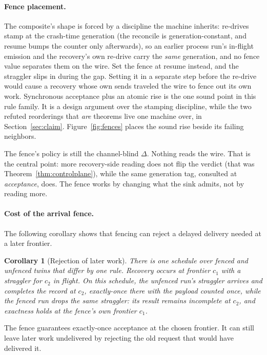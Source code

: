 \documentclass[sigplan,10pt]{acmart}
\theoremstyle{plain}
\newtheorem{corollary}{Corollary}[section]
\theoremstyle{definition}
\newcommand{\sdelta}{\Delta}               %
\begin{document}
\paragraph{Fence placement.}
The composite's shape is forced by a discipline the machine inherits:
re-drives stamp at the crash-time generation (the reconcile is
generation-constant, and resume bumps the counter only afterwards), so
an earlier process run's in-flight emission and the recovery's own
re-drive carry the \emph{same} generation, and no fence value separates
them on the wire. Set the fence at resume instead, and the straggler
slips in during the gap. Setting it in a separate step before the
re-drive would cause a recovery whose own sends traveled the wire to
fence out its own work. Synchronous acceptance plus an atomic rise is the one sound
point in this rule family. It is a design argument over the stamping
discipline, while the two refuted
reorderings that \emph{are} theorems live one machine over, in
Section~\ref{sec:claim}. Figure~\ref{fig:fences} places the sound rise
beside its failing neighbors.

The fence's policy is still the channel-blind $\sdelta$. Nothing reads
the wire. That is the central point: more recovery-side reading
does not flip the verdict (that was Theorem~\ref{thm:controlplane}),
while the same generation tag, consulted at \emph{acceptance}, does.
The fence works by changing what the sink admits, not by reading more.

\paragraph{Cost of the arrival fence.}
The following corollary shows that fencing can reject a delayed
delivery needed at a later frontier.

\begin{corollary}[Rejection of later work]\label{cor:price}
There is one schedule over fenced and unfenced twins that differ by one
rule. Recovery occurs at frontier $c_1$ with a straggler for $c_2$ in
flight. On this schedule, the unfenced run's straggler arrives and completes
the record at $c_2$, exactly-once there with the payload counted once,
while the fenced run drops the same straggler: its result remains incomplete at
$c_2$, and exactness holds at the fence's own frontier $c_1$.
\end{corollary}

The fence guarantees exactly-once acceptance at the chosen frontier.
It can still leave later work undelivered by rejecting the old request
that would have delivered it.
\end{document}
